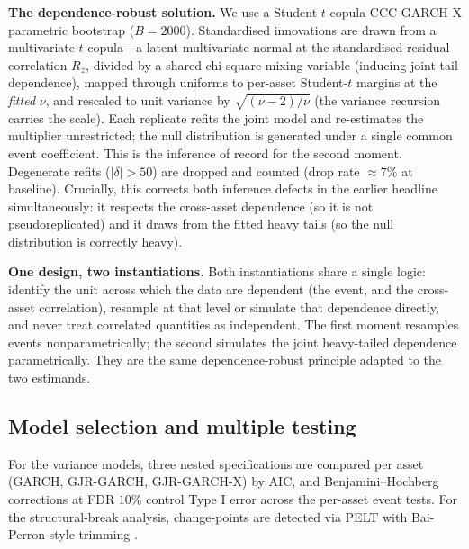 \documentclass[pdflatex,sn-mathphys-num]{sn-jnl}
\theoremstyle{thmstyleone}
\theoremstyle{thmstyletwo}
\theoremstyle{thmstylethree}
\begin{document}
\textbf{The dependence-robust solution.} We use a Student-$t$-copula CCC-GARCH-X parametric bootstrap ($B=2000$). Standardised innovations are drawn from a multivariate-$t$ copula---a latent multivariate normal at the standardised-residual correlation $R_z$, divided by a shared chi-square mixing variable (inducing joint tail dependence), mapped through uniforms to per-asset Student-$t$ margins at the \emph{fitted} $\nu$, and rescaled to unit variance by $\sqrt{(\nu-2)/\nu}$ (the variance recursion carries the scale). Each replicate refits the joint model and re-estimates the multiplier unrestricted; the null distribution is generated under a single common event coefficient. This is the inference of record for the second moment. Degenerate refits ($|\delta|>50$) are dropped and counted (drop rate $\approx 7\%$ at baseline). Crucially, this corrects both inference defects in the earlier headline simultaneously: it respects the cross-asset dependence (so it is not pseudoreplicated) and it draws from the fitted heavy tails (so the null distribution is correctly heavy).

\textbf{One design, two instantiations.} Both instantiations share a single logic: identify the unit across which the data are dependent (the event, and the cross-asset correlation), resample at that level or simulate that dependence directly, and never treat correlated quantities as independent. The first moment resamples events nonparametrically; the second simulates the joint heavy-tailed dependence parametrically. They are the same dependence-robust principle adapted to the two estimands.

\subsection{Model selection and multiple testing}

For the variance models, three nested specifications are compared per asset (GARCH, GJR-GARCH, GJR-GARCH-X) by AIC, and Benjamini--Hochberg corrections \citep{BenjaminiHochberg1995} at FDR $10\%$ control Type I error across the per-asset event tests. For the structural-break analysis, change-points are detected via PELT \citep{KillickFearnheadEckley2012} with Bai-Perron-style trimming \citep{BaiPerron1998, BaiPerron2003}.

\end{document}
